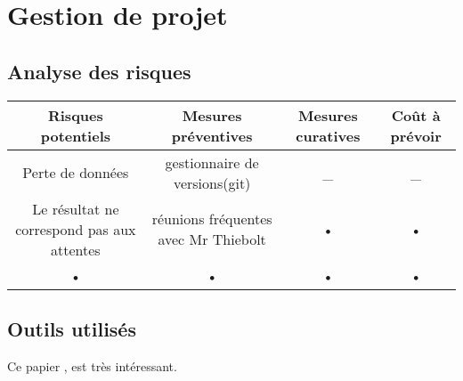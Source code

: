 \chapter{Gestion de projet}

\section{Analyse des risques}
\begin{tabular}{|c|c|c|c|}
\hline 
Risques potentiels & Mesures préventives & Mesures curatives & Coût à prévoir \\ 
\hline 
Perte de données & gestionnaire de versions(git) & \_ & \_ \\ 
\hline 
Le résultat ne correspond pas aux attentes & réunions fréquentes avec Mr Thiebolt & • & • \\ 
\hline 
• & • & • & • \\ 
\hline 
\end{tabular} 

%


\section{Outils utilisés}
Ce papier \cite{JIMENEZ2012_SMAA}, est très intéressant.